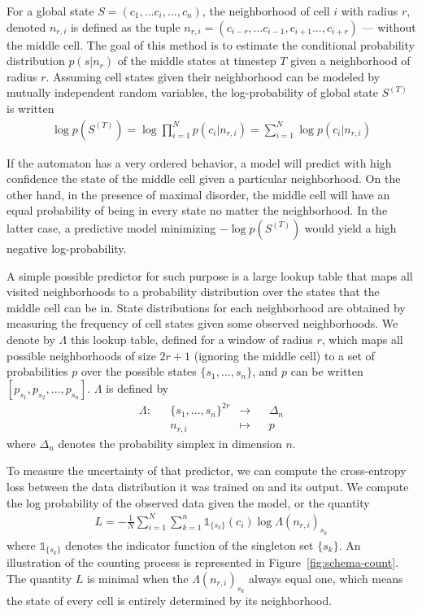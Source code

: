 For a global state $S = (c_{1}, ... c_i, ..., c_{n})$, the neighborhood of cell
$i$ with radius $r$, denoted $n_{r,i}$ is defined as the tuple $n_{r,i} =
(c_{i-r}, ... c_{i-1}, c_{i+1} ..., c_{i+r})$ --- without the middle cell. The
goal of this method is to estimate the conditional probability distribution $p(s
| n_r)$ of the middle states at timestep $T$ given a neighborhood of radius $r$.
Assuming cell states given their neighborhood can be modeled by mutually
independent random variables, the log-probability of global state $S^{(T)}$ is
written
\begin{align}
  \log p(S^{(T)}) = \log \prod_{i=1}^N p(c_i | n_{r,i})  =
  \sum_{i=1}^N \log  p(c_i | n_{r,i})
\end{align}

If the automaton has a very ordered behavior, a model will predict with high
confidence the state of the middle cell given a particular neighborhood. On the
other hand, in the presence of maximal disorder, the middle cell will have an
equal probability of being in every state no matter the neighborhood. In the
latter case, a predictive model minimizing $-\log p(S^{(T)})$ would yield a high
negative log-probability.

A simple possible predictor for such purpose is a large lookup table that maps
all visited neighborhoods to a probability distribution over the states that the
middle cell can be in. State distributions for each neighborhood are obtained by
measuring the frequency of cell states given some observed neighborhoods. We
denote by $\Lambda$ this lookup table, defined for a window of radius $r$, which
maps all possible neighborhoods of size $2r + 1$ (ignoring the middle cell) to a
set of probabilities $p$ over the possible states $\{s_1, ..., s_n\}$, and $p$
can be written $[p_{s_1}, p_{s_2}, ... , p_{s_n}]$. $\Lambda$ is defined by
\begin{equation}
  \begin{aligned}
    \Lambda :&& \{s_1, ..., s_n\}^{2r} &\to&& \Delta_n\\
    && n_{r,i} &\mapsto&& p
  \end{aligned}
\end{equation}
where $\Delta_n$ denotes the probability simplex in dimension $n$.

To measure the uncertainty of that predictor, we can compute the cross-entropy
loss between the data distribution it was trained on and its output. We compute
the log probability of the observed data given the model, or the quantity
\begin{align}
  L = - \frac{1}{N}\sum_{i=1}^N \sum_{k=1}^n \mathds{1}_{\{ s_k \}}(c_i)
  \log\Lambda(n_{r,i})_{s_k}
  \label{eq:loss_count}
\end{align}
where $\mathds{1}_{\{s_k\}}$ denotes the indicator function of the singleton set
$\{s_k\}$. An illustration of the counting process is represented in
Figure~\ref{fig:schema-count}. The quantity $L$ is minimal when the
$\Lambda(n_{r,i})_{s_k}$ always equal one, which means the state of every cell
is entirely determined by its neighborhood.


